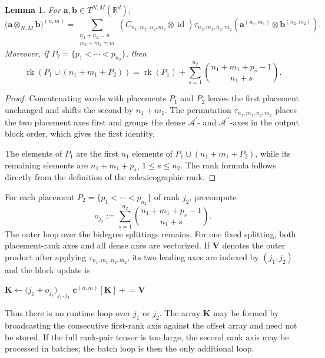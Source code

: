 \documentclass{amsart}
\newtheorem{lemma}[theorem]{Lemma}
\theoremstyle{definition}
\theoremstyle{remark}
\begin{document}
\begin{lemma}
\label{lem:ordered_concatenation}
For
$\mathbf{a},\mathbf{b}\in T^{N,M}(\mathbb{R}^d)$,
\[
    \bigl(
        \mathbf{a}\otimes_{N,M}\mathbf{b}
    \bigr)^{(n,m)}
    =
    \sum_{\substack{
        n_1+n_2=n\\
        m_1+m_2=m
    }}
    \left(
        C_{n_1,m_1,n_2,m_2}
        \otimes
        \operatorname{id}
    \right)
    \tau_{n_1,m_1,n_2,m_2}
    \left(
        \mathbf{a}^{(n_1,m_1)}
        \otimes
        \mathbf{b}^{(n_2,m_2)}
    \right).
\]
Moreover, if
$P_2=\{p_1<\cdots<p_{n_2}\}$, then
\begin{equation}\label{eq:concat_ord_rankdecomp}
    \operatorname{rk}
    \left(
        P_1\cup(n_1+m_1+P_2)
    \right)
    =
    \operatorname{rk}(P_1)
    +
    \sum_{s=1}^{n_2}
    \binom{n_1+m_1+p_s-1}{n_1+s}.
\end{equation}
\end{lemma}

\begin{proof}
Concatenating words with placements $P_1$ and $P_2$ leaves the first
placement unchanged and shifts the second by $n_1+m_1$. The permutation
$\tau_{n_1,m_1,n_2,m_2}$ places the two placement axes first and groups the
dense $\mathcal{A}^{\prime}$- and
$\mathcal{A}^{\prime\prime}$-axes in the output block order, which gives the
first identity.

The elements of $P_1$ are the first $n_1$ elements of
$P_1\cup(n_1+m_1+P_2)$, while its remaining elements are
$n_1+m_1+p_s$, $1\leq s\leq n_2$. The rank formula follows directly from
the definition of the colexicographic rank.
\end{proof}
\begin{implrmk}
For each placement $P_2=\{p_1<\cdots<p_{n_2}\}$ of rank $j_2$, precompute
\[
    o_{j_2}
    :=
    \sum_{s=1}^{n_2}
    \binom{n_1+m_1+p_s-1}{n_1+s}.
\]
The outer loop over the bidegree splittings remains. For one fixed
splitting, both placement-rank axes and all dense axes are vectorized. If
$\mathbf{V}$ denotes the outer product after applying
$\tau_{n_1,m_1,n_2,m_2}$, its two leading axes are indexed by
$(j_1,j_2)$ and the block update is
\begin{algorithmic}[1]
\State $\mathbf{K}\gets
    \bigl(j_1+o_{j_2}\bigr)_{j_1,j_2}$
\State $\mathbf{c}^{(n,m)}[\mathbf{K}]
    \mathrel{+}=\mathbf{V}$
\end{algorithmic}
Thus there is no runtime loop over $j_1$ or $j_2$. The array $\mathbf{K}$
may be formed by broadcasting the consecutive first-rank axis against the
offset array and need not be stored. If the full rank-pair tensor is too
large, the second rank axis may be processed in batches; the batch loop is
then the only additional loop.
\end{implrmk}
\end{document}
